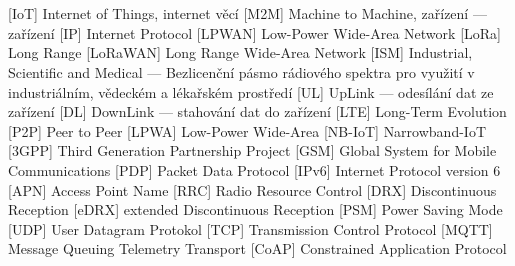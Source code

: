 \cleardoublepage
\chapter*{\listofabbrevname}
{}

\begin{acronym}[LoRaWAN]   %
            [IoT]   %
            {Internet of Things, internet věcí} %
            [M2M]
            {Machine to Machine, zařízení — zařízení}
            [IP]
            {Internet Protocol}
            [LPWAN]
            {Low-Power Wide-Area Network}
            [LoRa]
            {Long Range}
            [LoRaWAN]
            {Long Range Wide-Area Network}
            [ISM]
            {Industrial, Scientific and Medical — Bezlicenční pásmo rádiového spektra pro využití v industriálním, vědeckém a lékařském prostředí}
            [UL]
            {UpLink — odesílání dat ze zařízení}
            [DL]
            {DownLink — stahování dat do zařízení}
            [LTE]
            {Long-Term Evolution}
            [P2P]
            {Peer to Peer}
            [LPWA]
            {Low-Power Wide-Area}
            [NB-IoT]
            {Narrowband-IoT}
            [3GPP]
            {Third Generation Partnership Project}
            [GSM]
            {Global System for Mobile Communications}
            [PDP]
            {Packet Data Protocol}
            [IPv6]
            {Internet Protocol version 6}  
            [APN]
            {Access Point Name}
            [RRC]
            {Radio Resource Control}   
            [DRX]
            {Discontinuous Reception}
            [eDRX]
            {extended Discontinuous Reception}
            [PSM]
            {Power Saving Mode}
            [UDP]
            {User Datagram Protokol}
            [TCP]
            {Transmission Control Protocol}
            [MQTT]
            {Message Queuing Telemetry Transport}
            [CoAP]
            {Constrained Application Protocol}

\end{acronym}
